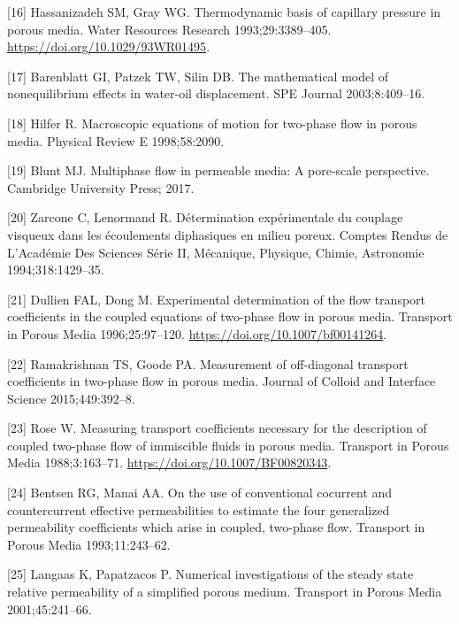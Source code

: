 \documentclass[]{article}
\begin{document}
\leavevmode\hypertarget{ref-Hassanizadeh1993}{}%
{[}16{]} Hassanizadeh SM, Gray WG. Thermodynamic basis of capillary
pressure in porous media. Water Resources Research 1993;29:3389--405.
\url{https://doi.org/10.1029/93WR01495}.

\leavevmode\hypertarget{ref-barenblatt2003mathematical}{}%
{[}17{]} Barenblatt GI, Patzek TW, Silin DB. The mathematical model of
nonequilibrium effects in water-oil displacement. SPE Journal
2003;8:409--16.

\leavevmode\hypertarget{ref-hilfer1998macroscopic}{}%
{[}18{]} Hilfer R. Macroscopic equations of motion for two-phase flow in
porous media. Physical Review E 1998;58:2090.

\leavevmode\hypertarget{ref-blunt2017multiphase}{}%
{[}19{]} Blunt MJ. Multiphase flow in permeable media: A pore-scale
perspective. Cambridge University Press; 2017.

\leavevmode\hypertarget{ref-zarcone1994determination}{}%
{[}20{]} Zarcone C, Lenormand R. Détermination expérimentale du couplage
visqueux dans les écoulements diphasiques en milieu poreux. Comptes
Rendus de L'Académie Des Sciences Série II, Mécanique, Physique, Chimie,
Astronomie 1994;318:1429--35.

\leavevmode\hypertarget{ref-Dullien1996}{}%
{[}21{]} Dullien FAL, Dong M. Experimental determination of the flow
transport coefficients in the coupled equations of two-phase flow in
porous media. Transport in Porous Media 1996;25:97--120.
\url{https://doi.org/10.1007/bf00141264}.

\leavevmode\hypertarget{ref-ramakrishnan2015measurement}{}%
{[}22{]} Ramakrishnan TS, Goode PA. Measurement of off-diagonal
transport coefficients in two-phase flow in porous media. Journal of
Colloid and Interface Science 2015;449:392--8.

\leavevmode\hypertarget{ref-Rose1988}{}%
{[}23{]} Rose W. Measuring transport coefficients necessary for the
description of coupled two-phase flow of immiscible fluids in porous
media. Transport in Porous Media 1988;3:163--71.
\url{https://doi.org/10.1007/BF00820343}.

\leavevmode\hypertarget{ref-bentsen1993use}{}%
{[}24{]} Bentsen RG, Manai AA. On the use of conventional cocurrent and
countercurrent effective permeabilities to estimate the four generalized
permeability coefficients which arise in coupled, two-phase flow.
Transport in Porous Media 1993;11:243--62.

\leavevmode\hypertarget{ref-langaas2001numerical}{}%
{[}25{]} Langaas K, Papatzacos P. Numerical investigations of the steady
state relative permeability of a simplified porous medium. Transport in
Porous Media 2001;45:241--66.
\end{document}
